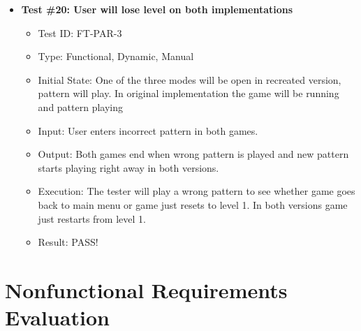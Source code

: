 \documentclass[12pt, titlepage]{article}
\begin{document}
\begin{itemize}
\item \textbf{Test \#20: User will lose level on both implementations }
\begin{itemize}
\item Test ID: FT-PAR-3
\item Type: Functional, Dynamic, Manual 		
\item Initial State: One of the three modes will be open in recreated version, pattern will play. In original implementation the game will be running and pattern playing				
\item Input: User enters incorrect pattern in both games.
\item Output: Both games end when wrong pattern is played and new pattern starts playing right away in both versions.			
\item Execution: The tester will play a wrong pattern to see whether game goes back to main menu or game just resets to level 1. In both versions game just restarts from level 1.
\item Result: PASS!
\end{itemize}

\end{itemize}

\section{Nonfunctional Requirements Evaluation}
\end{document}
